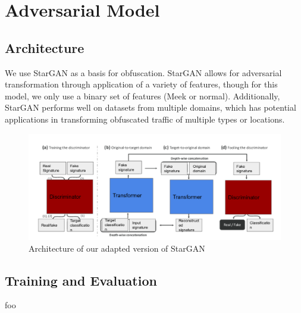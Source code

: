 \section{Adversarial Model}
\subsection{Architecture}
We use StarGAN \cite{Choi_2018_CVPR} as a basis for obfuscation. StarGAN allows for adversarial transformation through application of a variety of features, though for this model, we only use a binary set of features (Meek or normal). Additionally, StarGAN performs well on datasets from multiple domains, which has potential applications in transforming obfuscated traffic of multiple types or locations.
\begin{figure}
    \begin{center}
        \includegraphics[width=\textwidth]{figures/stargan-architecture}
    \end{center}
    \caption{\label{fig:data-collection-architecture} Architecture of our adapted version of StarGAN} 
\end{figure}
\subsection{Training and Evaluation}
foo
